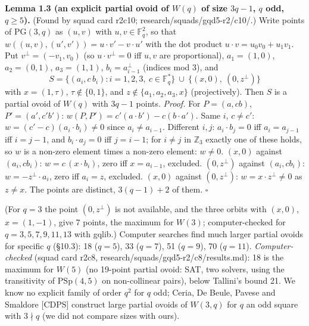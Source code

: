 \documentclass[
  11pt,
]{article}
\begin{document}
\textbf{Lemma 1.3 (an explicit partial ovoid of \(W(q)\) of size
\(3q-1\), \(q\) odd, \(q\ge 5\)).} (Found by squad card r2c10;
research/squads/gqd5-r2/c10/.) Write points of \(\mathrm{PG}(3,q)\) as
\((u,v)\) with \(u,v\in\mathbb F_q^2\), so that
\(w((u,v),(u',v')) = u\cdot v' - v\cdot u'\) with the dot product
\(u\cdot v = u_0v_0+u_1v_1\). Put \(v^\perp = (-v_1,v_0)\) (so
\(u\cdot v^\perp = 0\) iff \(u,v\) are proportional), \(a_1 = (1,0)\),
\(a_2 = (0,1)\), \(a_3 = (1,1)\), \(b_i = a_{i-1}^\perp\) (indices mod
3), and
\[S = \{(a_i, c\,b_i): i = 1,2,3,\ c\in\mathbb F_q^*\}\ \cup\ \{(x,0),\ (0,z^\perp)\}\]
with \(x = (1,\tau)\), \(\tau\notin\{0,1\}\), and
\(z\notin\{a_1,a_2,a_3,x\}\) (projectively). Then \(S\) is a partial
ovoid of \(W(q)\) with \(3q-1\) points. \emph{Proof.} For
\(P = (a,cb)\), \(P' = (a',c'b')\):
\(w(P,P') = c'(a\cdot b')-c(b\cdot a')\). Same \(i\), \(c\ne c'\):
\(w = (c'-c)(a_i\cdot b_i)\ne 0\) since \(a_i\ne a_{i-1}\). Different
\(i,j\): \(a_i\cdot b_j = 0\) iff \(a_i = a_{j-1}\) iff \(i = j-1\), and
\(b_i\cdot a_j = 0\) iff \(j = i-1\); for \(i\ne j\) in \(\mathbb Z_3\)
exactly one of these holds, so \(w\) is a non-zero element times a
non-zero element: \(w\ne 0\). \((x,0)\) against \((a_i,cb_i)\):
\(w = c\,(x\cdot b_i)\), zero iff \(x = a_{i-1}\), excluded.
\((0,z^\perp)\) against \((a_i,cb_i)\): \(w = -z^\perp\cdot a_i\), zero
iff \(a_i = z\), excluded. \((x,0)\) against \((0,z^\perp)\):
\(w = x\cdot z^\perp\ne 0\) as \(z\ne x\). The points are distinct,
\(3(q-1)+2\) of them. \(\square\)

(For \(q = 3\) the point \((0,z^\perp)\) is not available, and the three
orbits with \((x,0)\), \(x = (1,-1)\), give 7 points, the maximum for
\(W(3)\); computer-checked for \(q = 3,5,7,9,11,13\) with gqlib.)
Computer searches find much larger partial ovoids for specific \(q\)
(§10.3): 18 (\(q=5\)), 33 (\(q=7\)), 51 (\(q=9\)), 70 (\(q=11\)).
\emph{Computer-checked} (squad card r2c8,
research/squads/gqd5-r2/c8/results.md): 18 is the maximum for \(W(5)\)
(no 19-point partial ovoid: SAT, two solvers, using the transitivity of
\(\mathrm{PSp}(4,5)\) on non-collinear pairs), below Tallini's bound 21.
We know no explicit family of order \(q^2\) for \(q\) odd; Ceria, De
Beule, Pavese and Smaldore {[}CDPS{]} construct large partial ovoids of
\(W(3,q)\) for \(q\) an odd square with \(3\nmid q\) (we did not compare
sizes with ours).
\end{document}

